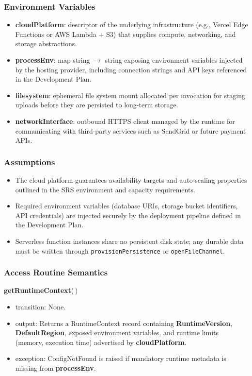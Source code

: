 \documentclass[12pt, titlepage]{article}
\begin{document}
\subsubsection{Environment Variables}
\begin{itemize}
  \item \textbf{cloudPlatform}: descriptor of the underlying infrastructure (e.g., Vercel Edge Functions or AWS Lambda + S3) that supplies compute, networking, and storage abstractions.
  \item \textbf{processEnv}: map string $\rightarrow$ string exposing environment variables injected by the hosting provider, including connection strings and API keys referenced in the Development Plan.
  \item \textbf{filesystem}: ephemeral file system mount allocated per invocation for staging uploads before they are persisted to long-term storage.
  \item \textbf{networkInterface}: outbound HTTPS client managed by the runtime for communicating with third-party services such as SendGrid or future payment APIs.
\end{itemize}

\subsubsection{Assumptions}
\begin{itemize}
  \item The cloud platform guarantees availability targets and auto-scaling properties outlined in the SRS environment and capacity requirements.
  \item Required environment variables (database URIs, storage bucket identifiers, API credentials) are injected securely by the deployment pipeline defined in the Development Plan.
  \item Serverless function instances share no persistent disk state; any durable data must be written through \texttt{provisionPersistence} or \texttt{openFileChannel}.
\end{itemize}

\subsubsection{Access Routine Semantics}
\noindent\textbf{getRuntimeContext}($\,$)
\begin{itemize}
  \item transition: None.
  \item output: Returns a RuntimeContext record containing \textbf{RuntimeVersion}, \textbf{DefaultRegion}, exposed environment variables, and runtime limits (memory, execution time) advertised by \textbf{cloudPlatform}.
  \item exception: ConfigNotFound is raised if mandatory runtime metadata is missing from \textbf{processEnv}.
\end{itemize}
\end{document}
